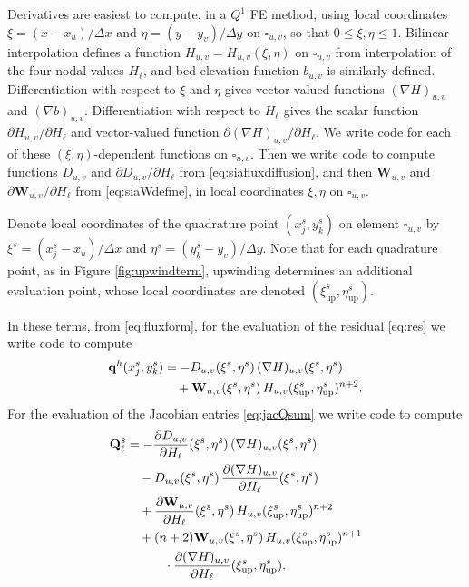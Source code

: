 \documentclass[twocolumn,letterpaper]{igs}
\newcommand\bq{\mathbf{q}}
\newcommand\bQ{\mathbf{Q}}
\newcommand\bW{\mathbf{W}}
\newcommand{\grad}{\nabla}
\begin{document}
\newcommand{\uppoint}{(\xi_{\text{up}}^s,\eta_{\text{up}}^s)}
Derivatives are easiest to compute, in a $Q^1$ FE method, using local coordinates $\xi=(x-x_u)/\Delta x$ and $\eta=(y-y_v)/\Delta y$ on $\square_{u,v}$, so that $0\le \xi,\eta \le 1$.  Bilinear interpolation defines a function $H_{u,v}=H_{u,v}(\xi,\eta)$ on $\square_{u,v}$ from interpolation of the four nodal values $H_\ell$, and bed elevation function $b_{u,v}$ is similarly-defined.  Differentiation with respect to $\xi$ and $\eta$ gives vector-valued functions $(\grad H)_{u,v}$ and $(\grad b)_{u,v}$.  Differentiation with respect to $H_\ell$ gives the scalar function $\partial H_{u,v}/\partial H_\ell$ and vector-valued function $\partial (\grad H)_{u,v}/\partial H_\ell$.  We write code for each of these $(\xi,\eta)$-dependent functions on $\square_{u,v}$.  Then we write code to compute functions $D_{u,v}$ and $\partial D_{u,v}/\partial H_\ell$ from \eqref{eq:siafluxdiffusion}, and then $\bW_{u,v}$ and $\partial \bW_{u,v}/\partial H_\ell$ from \eqref{eq:siaWdefine}, in local coordinates $\xi,\eta$ on $\square_{u,v}$.

Denote local coordinates of the quadrature point $(x_j^s,y_k^s)$ on element $\square_{u,v}$ by $\xi^s = (x_j^s-x_u)/\Delta x$ and $\eta^s = (y_k^s-y_v)/\Delta y$.  Note that for each quadrature point, as in Figure \ref{fig:upwindterm}, upwinding determines an additional evaluation point, whose local coordinates are denoted $\uppoint$.

In these terms, from \eqref{eq:fluxform}, for the evaluation of the residual \eqref{eq:res} we write code to compute
\begin{align}
\bq^h(x_j^s,y_k^s) &= - D_{u,v}(\xi^s,\eta^s)\, (\grad H)_{u,v}(\xi^s,\eta^s) \label{eq:resfinalformula} \\
   &\quad + \bW_{u,v}(\xi^s,\eta^s) \, H_{u,v}\uppoint^{n+2}. \notag
\end{align}
For the evaluation of the Jacobian entries \eqref{eq:jacQsum} we write code to compute
\begin{align}
\bQ_\ell^s &= - \frac{\partial D_{u,v}}{\partial H_\ell}(\xi^s,\eta^s)\, (\grad H)_{u,v}(\xi^s,\eta^s) \label{eq:jacfinalformula} \\
   &\quad - D_{u,v}(\xi^s,\eta^s)\, \frac{\partial (\grad H)_{u,v}}{\partial H_\ell}(\xi^s,\eta^s) \notag \\
   &\quad + \frac{\partial \bW_{u,v}}{\partial H_\ell}(\xi^s,\eta^s) \, H_{u,v}\uppoint^{n+2} \notag \\
   &\quad + (n+2) \bW_{u,v}(\xi^s,\eta^s)\, H_{u,v}\uppoint^{n+1} \notag \\
   &\qquad\quad \cdot \frac{\partial (\grad H)_{u,v}}{\partial H_\ell}\uppoint. \notag
\end{align}
\end{document}
